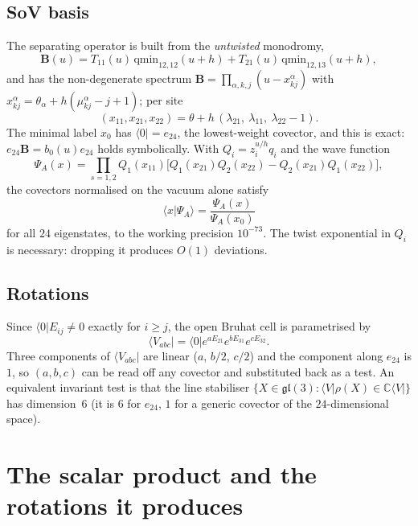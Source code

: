 \documentclass[11pt]{article}
\newcommand{\gl}{\mathfrak{gl}}
\newcommand{\bra}[1]{\langle #1|}
\newcommand{\vac}{\langle 0|}
\begin{document}
\subsection{SoV basis}

The separating operator is built from the \emph{untwisted} monodromy,
\begin{equation}
\mathbf B(u)=T_{11}(u)\,\mathrm{qmin}_{12,12}(u+h)+T_{21}(u)\,\mathrm{qmin}_{12,13}(u+h),
\end{equation}
and has the non-degenerate spectrum $\mathbf B=\prod_{\alpha,k,j}(u-x^\alpha_{kj})$ with
$x^\alpha_{kj}=\theta_\alpha+h(\mu^\alpha_{kj}-j+1)$; per site
\begin{equation}
(x_{11},x_{21},x_{22})=\theta+h\,(\lambda_{21},\ \lambda_{11},\ \lambda_{22}-1).
\end{equation}
The minimal label $x_0$ has $\vac=e_{24}$, the lowest-weight covector, and this is exact:
$e_{24}\mathbf B=b_0(u)e_{24}$ holds symbolically. With $Q_i=z_i^{u/h}q_i$ and the wave function
\begin{equation}
\Psi_A(x)=\prod_{s=1,2} Q_1(x_{11})\big[Q_1(x_{21})Q_2(x_{22})-Q_2(x_{21})Q_1(x_{22})\big],
\label{eq:psi}
\end{equation}
the covectors normalised on the vacuum alone satisfy
\begin{equation}
\bra{x}\Psi_A\rangle=\frac{\Psi_A(x)}{\Psi_A(x_0)}
\end{equation}
for all $24$ eigenstates, to the working precision $10^{-73}$. The twist exponential in $Q_i$ is
necessary: dropping it produces $O(1)$ deviations.

\subsection{Rotations}

Since $\vac E_{ij}\neq0$ exactly for $i\ge j$, the open Bruhat cell is parametrised by
\begin{equation}
\bra{V_{abc}}=\vac e^{aE_{21}}e^{bE_{31}}e^{cE_{32}} .
\end{equation}
Three components of $\bra{V_{abc}}$ are linear ($a$, $b/2$, $c/2$) and the component along $e_{24}$
is $1$, so $(a,b,c)$ can be read off any covector and substituted back as a test. An equivalent
invariant test is that the line stabiliser $\{X\in\gl(3):\bra{V}\rho(X)\in\mathbb C\bra{V}\}$ has
dimension~$6$ (it is $6$ for $e_{24}$, $1$ for a generic covector of the $24$-dimensional space).

\section{The scalar product and the rotations it produces}
\end{document}
